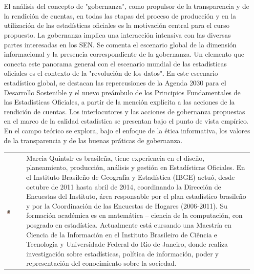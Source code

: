 \begin{center}
\textbf{\textcolor{ultramarine}{\titulo \\}}
\bigskip
\textit{\presentador \\}
\bigskip
\scriptsize{\lugar}
\bigskip
\end{center}

\noindent El análisis del concepto de "gobernanza", como propulsor de la transparencia y de la rendición de cuentas, en todas las etapas del proceso de producción y en la utilización de las estadísticas oficiales es la motivación central para el curso propuesto. La gobernanza implica una interacción intensiva con las diversas partes interesadas en los SEN. Se comenta el escenario global de la dimensión informacional y la presencia correspondiente de la gobernanza. Un elemento que conecta este panorama general con el escenario mundial de las estadísticas oficiales es el contexto de la "revolución de los datos". En este escenario estadístico global, se destacan las repercusiones de la Agenda 2030 para el Desarrollo Sostenible y el nuevo preámbulo de los Principios Fundamentales de las Estadísticas Oficiales, a partir de la mención explícita a las acciones de la rendición de cuentas. Los interlocutores y las acciones de gobernanza propuestas en el marco de la calidad estadística se presentan bajo el punto de vista empírico. En el campo teórico se explora, bajo el enfoque de la ética informativa, los valores de la transparencia y de las buenas práticas de gobernanza.

\begin{table}[H]
\centering
\begin{tabular}{m{}  m{}}
\begin{center} 
\includegraphics[width=0.2\textwidth]{./fotos/marcia} \end{center} & 
\noindent \small{Marcia Quintslr es brasileña, tiene experiencia en el diseño, planeamiento, producción, análisis y gestión en Estadísticas Oficiales. En el Instituto Brasileño de Geografía y Estadística (IBGE) actuó, desde octubre de 2011 hasta abril de 2014, coordinando la Dirección de Encuestas del Instituto, área responsable por el plan estadístico brasileño y por la Coordinación de las Encuestas de Hogares (2006-2011). Su formación académica es en matemática – ciencia de la computación, con posgrado en estadística. Actualmente está cursando una Maestría en Ciencia de la Información en el Instituto Brasileiro de Ciência e Tecnologia y Universidade Federal do Rio de Janeiro, donde realiza investigación sobre estadísticas, política de información, poder y representación del
conocimiento sobre la sociedad.} \\
\end{tabular}
\end{table}

